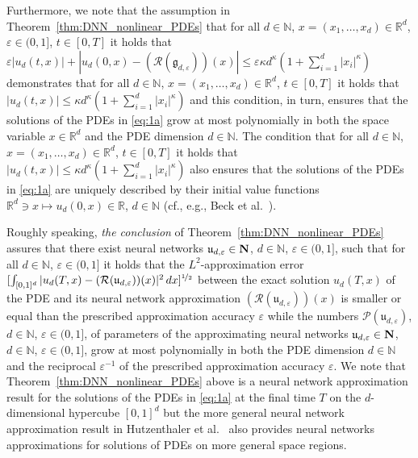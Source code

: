 \documentclass[12pt,AutoFakeBold,AutoFakeSlant]{article}
\theoremstyle{definition}
\newcommand{\R}{\mathbb{R}}
\newcommand{\N}{\mathbb{N}}
\begin{document}
	Furthermore, we note that 
	the assumption in Theorem~\ref{thm:DNN_nonlinear_PDEs} 
	that for all 
	$ d \in \N $, $ x = (x_1, \dots, x_d) \in \R^d $, 
	$ \varepsilon \in (0,1] $, $ t \in [0,T] $ 
	it holds that 
	$ 
	\varepsilon | u_d(t,x) | 
	+ \allowbreak 
	| u_d(0,x) \allowbreak - ( \mathcal{R}(\mathfrak{g}_{d,\varepsilon}) )(x) | 
	\le \varepsilon \kappa d^\kappa (1 + \sum_{ i = 1 }^d | x_i |^\kappa ) 
	$
	demonstrates that 
	for all 
	$ d \in \N $, $ x = (x_1, \dots, x_d) \in \R^d $, 
	$ t \in [0,T] $ 
	it holds that 
	$ 
	| u_d(t,x) | 
	\le \kappa d^\kappa (1 + \sum_{ i = 1 }^d | x_i |^\kappa ) 
	$
	and this condition, in turn, ensures 
	that the solutions of the PDEs in \eqref{eq:1a} 
	grow at most polynomially 
	in both the space variable $ x \in \R^d $
	and the PDE dimension $ d \in \N $. 
	The condition that 
	for all 
	$ d \in \N $, $ x = (x_1, \dots, x_d) \in \R^d $, 
	$ t \in [0,T] $ 
	it holds that 
	$ 
	| u_d(t,x) | 
	\le \kappa d^\kappa (1 + \sum_{ i = 1 }^d | x_i |^\kappa ) 
	$
	also ensures that the solutions of the PDEs in \eqref{eq:1a} 
	are uniquely described by their initial value 
	functions 
	$
	\R^d \ni x \mapsto u_d(0,x) \in \R
	$,
	$ d \in \N $ (cf., e.g., Beck et al.~\cite[Theorem~1.1]{beck2020nonlinear}).



	Roughly speaking, \emph{the conclusion} of Theorem~\ref{thm:DNN_nonlinear_PDEs} 
	assures that there exist neural networks 
	$ \mathfrak{u}_{d,\varepsilon} \in {\bf N} $,
	$ d \in \N $, $ \varepsilon \in (0,1] $,
	such that for all 
	$ d \in \N $, $ \varepsilon \in (0,1] $ 
	it holds that the $ L^2 $-approximation error 
	$
	[ 
		\int_{ [0,1]^d } 
		| 
			u_d(T,x) - 
			( \mathcal{R}( \mathfrak{u}_{ d, \varepsilon } ) )(x) 
		|^2 
		\,
		dx 
	]^{ \nicefrac{ 1 }{ 2 } } 
	$
	between the exact solution 
	$
	u_d(T,x)
	$
	of the PDE 
	and its neural network approximation 
	$
	( \mathcal{R}( \mathfrak{u}_{ d, \varepsilon } ) )(x) 
	$
	is smaller or equal than 
	the prescribed approximation accuracy 
	$ \varepsilon $ 
	while the numbers  
	$
	\mathcal{P}( \mathfrak{u}_{d,\varepsilon} ) 
	$,
	$ d \in \N $,
	$ \varepsilon \in (0,1] $,
	of parameters 
	of the approximating neural networks 
	$ \mathfrak{u}_{d,\varepsilon} \in {\bf N} $,
	$ d \in \N $, $ \varepsilon \in (0,1] $, 
	grow at most polynomially 
	in both 
	the PDE dimension $ d \in \N $ 
	and the reciprocal $ \varepsilon^{ - 1 } $ 
	of the prescribed approximation accuracy $ \varepsilon $. 
	We note that Theorem~\ref{thm:DNN_nonlinear_PDEs} 
	above is a neural network approximation result 
	for the solutions 
	of the PDEs in \eqref{eq:1a} at the final time $ T $ 
	on the $ d $-dimensional hypercube $ [0,1]^d $ 
	but the more general neural network approximation result 
	in Hutzenthaler et al.~\cite[Theorem~4.1]{hutzenthaler2020proof}
	also provides neural networks approximations 
	for solutions 
	of PDEs 
	on more general space regions. 
\end{document}
